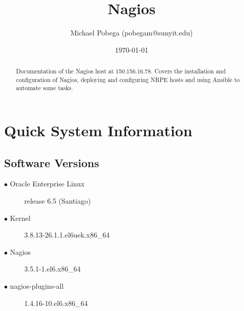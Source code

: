 \documentclass[a4paper]{article}
\title{Nagios}
\author{Michael Pobega (pobegam@sunyit.edu)}
\date{\today}
\begin{document}
\begin{titlepage}
\clearpage\maketitle
\thispagestyle{empty}

\begin{abstract}
Documentation of the Nagios host at 150.156.16.78. Covers the installation and configuration of Nagios, deploying and configuring NRPE hosts and using Ansible to automate some tasks.
\end{abstract}

\clearpage
\thispagestyle{empty}
\tableofcontents
\end{titlepage}
\clearpage

\section{Quick System Information}
\label{sec:info}

\subsection{Software Versions}
\begin{description}
  \item[$\bullet$ Oracle Enterprise Linux] release 6.5 (Santiago)
  \item[$\bullet$ Kernel] 3.8.13-26.1.1.el6uek.x86\_64
  \item[$\bullet$ Nagios] 3.5.1-1.el6.x86\_64
  \item[$\bullet$ nagios-plugins-all] 1.4.16-10.el6.x86\_64
\end{description}
\end{document}
